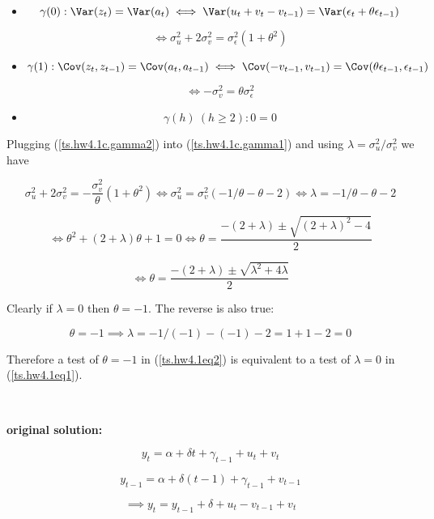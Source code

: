 \begin{enumerate}[(a)]
\begin{itemize}

\item
\[
\gamma(0): \Var(z_t) = \Var(a_t) \iff \Var(u_t + v_t - v_{t-1}) = \Var(\epsilon_t + \theta \epsilon_{t-1}) 
\]

\begin{equation}  \label{ts.hw4.1c.gamma1}
\iff  \sigma_u^2 + 2 \sigma_v^2 = \sigma_\epsilon^2 (1 + \theta^2)
\end{equation}

\item
\[
\gamma(1): \Cov(z_t, z_{t-1}) = \Cov(a_t, a_{t-1}) \iff \Cov(-v_{t-1}, v_{t-1}) = \Cov(\theta\epsilon_{t-1}, \epsilon_{t-1})
\]

\begin{equation} \label{ts.hw4.1c.gamma2}
\iff -\sigma_v^2 = \theta \sigma_\epsilon^2
\end{equation}

\item
\[
\gamma(h) \ (h \geq 2): 0 = 0
\]

\end{itemize}

Plugging (\ref{ts.hw4.1c.gamma2}) into (\ref{ts.hw4.1c.gamma1}) and using \(\lambda = \sigma_u^2/\sigma_v^2\) we have

\[
\sigma_u^2 + 2 \sigma_v^2 =  -\frac{\sigma_v^2 }{\theta}(1 + \theta^2) \iff \sigma_u^2 = \sigma_v^2(-1/\theta - \theta - 2) \iff \lambda = -1/\theta - \theta - 2
\]

\[
\iff \theta^2 + (2 + \lambda)\theta + 1 = 0 \iff \theta = \frac{-(2 + \lambda) \pm \sqrt{(2+\lambda)^2 - 4}}{2}
\]

\[
\iff \boxed{\theta = \frac{-(2 + \lambda) \pm \sqrt{\lambda^2 + 4 \lambda }}{2}}
\]

Clearly if \(\lambda = 0\) then \(\theta = -1\). The reverse is also true:

\[
\theta = -1 \implies \lambda = -1/(-1)- (-1) - 2 = 1 +  1 -2 = 0
\]

Therefore a test of \(\theta = -1\) in (\ref{ts.hw4.1eq2}) is equivalent to a test of \(\lambda = 0\) in (\ref{ts.hw4.1eq1}).

\

\textbf{original solution:} 

\[
y_t = \alpha + \delta t +  \gamma_{t-1} + u_t + v_t
\]

\[
y_{t-1} =  \alpha + \delta (t - 1) +  \gamma_{t-1} + v_{t-1}
\]

\[
\implies y_t = y_{t-1} + \delta + u_t - v_{t-1} + v_t
\]


\end{enumerate}
